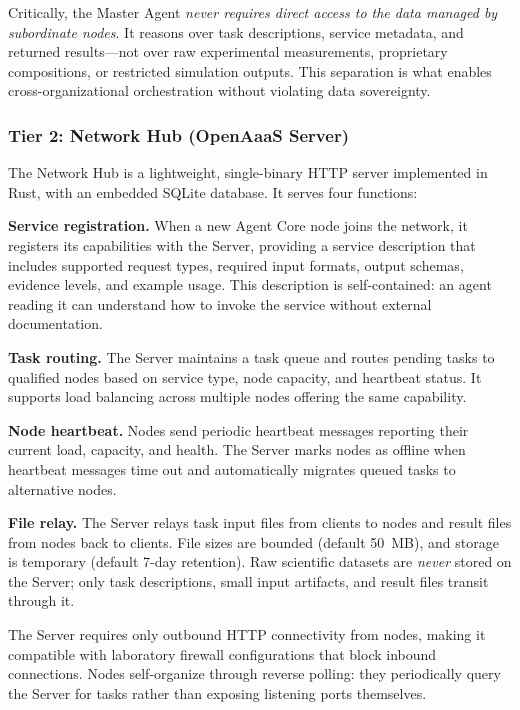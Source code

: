 \documentclass{article}
\begin{document}
Critically, the Master Agent \textit{never requires direct access to the data managed by subordinate nodes}. It reasons over task descriptions, service metadata, and returned results---not over raw experimental measurements, proprietary compositions, or restricted simulation outputs. This separation is what enables cross-organizational orchestration without violating data sovereignty.

\subsubsection{Tier 2: Network Hub (OpenAaaS Server)}

The Network Hub is a lightweight, single-binary HTTP server implemented in Rust, with an embedded SQLite database. It serves four functions:

\textbf{Service registration.} When a new Agent Core node joins the network, it registers its capabilities with the Server, providing a service description that includes supported request types, required input formats, output schemas, evidence levels, and example usage. This description is self-contained: an agent reading it can understand how to invoke the service without external documentation.

\textbf{Task routing.} The Server maintains a task queue and routes pending tasks to qualified nodes based on service type, node capacity, and heartbeat status. It supports load balancing across multiple nodes offering the same capability.

\textbf{Node heartbeat.} Nodes send periodic heartbeat messages reporting their current load, capacity, and health. The Server marks nodes as offline when heartbeat messages time out and automatically migrates queued tasks to alternative nodes.

\textbf{File relay.} The Server relays task input files from clients to nodes and result files from nodes back to clients. File sizes are bounded (default 50~MB), and storage is temporary (default 7-day retention). Raw scientific datasets are \textit{never} stored on the Server; only task descriptions, small input artifacts, and result files transit through it.

The Server requires only outbound HTTP connectivity from nodes, making it compatible with laboratory firewall configurations that block inbound connections. Nodes self-organize through reverse polling: they periodically query the Server for tasks rather than exposing listening ports themselves.
\end{document}
